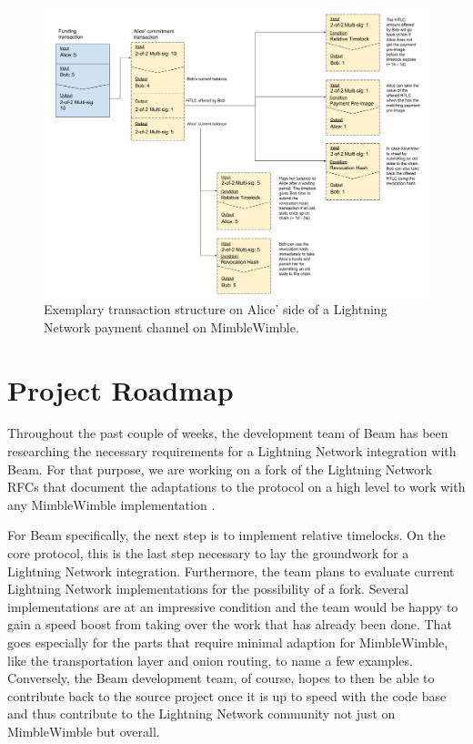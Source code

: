 \documentclass[letterpaper]{article}
\begin{document}
\begin{figure}[h]
	\centering
	\includegraphics[width=\textwidth]{lightning_mw_transactions_htlc}
	\caption{Exemplary transaction structure on Alice’ side of a Lightning Network payment channel on MimbleWimble.}
\end{figure}

\section{Project Roadmap}
Throughout the past couple of weeks, the development team of Beam has been researching the necessary requirements for a Lightning Network integration with Beam. For that purpose, we are working on a fork of the Lightning Network RFCs that document the adaptations to the protocol on a high level to work with any MimbleWimble implementation \cite{lmw}.

For Beam specifically, the next step is to implement relative timelocks. On the core protocol, this is the last step necessary to lay the groundwork for a Lightning Network integration. Furthermore, the team plans to evaluate current Lightning Network implementations for the possibility of a fork. Several implementations are at an impressive condition and the team would be happy to gain a speed boost from taking over the work that has already been done. That goes especially for the parts that require minimal adaption for MimbleWimble, like the transportation layer and onion routing, to name a few examples. Conversely, the Beam development team, of course, hopes to then be able to contribute back to the source project once it is up to speed with the code base and thus contribute to the Lightning Network community not just on MimbleWimble but overall.

\printbibliography
\end{document}
